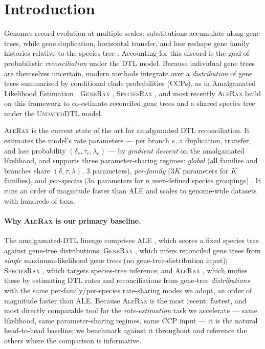 \documentclass[11pt]{article}
\newcommand{\bdelta}{\delta}
\newcommand{\btau}{\tau}
\newcommand{\blambda}{\lambda}
\begin{document}
\section{Introduction}
\label{sec:intro}

Genomes record evolution at multiple scales: substitutions accumulate along
gene trees, while gene duplication, horizontal transfer, and loss reshape gene
family histories relative to the species tree \citep{Szollosi2015}. Accounting
for this discord is the goal of probabilistic \emph{reconciliation} under the
DTL model. Because individual gene trees are themselves uncertain, modern
methods integrate over a \emph{distribution} of gene trees summarised by
conditional clade probabilities (CCPs), as in Amalgamated Likelihood
Estimation \citep{Szollosi2013,Hohna2012,Larget2013}. \textsc{GeneRax}
\citep{Morel2020}, \textsc{SpeciesRax} \citep{Morel2022}, and most recently
\textsc{AleRax} \citep{Morel2024} build on this framework to co-estimate
reconciled gene trees and a shared species tree under the \textsc{UndatedDTL}
model.

\textsc{AleRax} is the current state of the art for amalgamated DTL
reconciliation. It estimates the model's rate parameters --- per branch $e$, a
duplication, transfer, and loss probability
$(\bdelta_e,\btau_e,\blambda_e)$ --- by \emph{gradient descent} on the
amalgamated likelihood, and supports three parameter-sharing regimes:
\emph{global} (all families and branches share $(\bdelta,\btau,\blambda)$,
$3$ parameters), \emph{per-family} ($3K$ parameters for $K$ families), and
\emph{per-species} ($3n$ parameters for $n$ user-defined species groupings)
\citep{Morel2024}. It runs an order of magnitude faster than ALE and scales to
genome-wide datasets with hundreds of taxa.

\paragraph{Why \textsc{AleRax} is our primary baseline.} The amalgamated-DTL
lineage comprises ALE \citep{Szollosi2013}, which scores a fixed species tree
against gene-tree distributions; \textsc{GeneRax} \citep{Morel2020}, which
infers reconciled gene trees from \emph{single} maximum-likelihood gene trees
(no gene-tree-distribution input); \textsc{SpeciesRax} \citep{Morel2022}, which
targets species-tree inference; and \textsc{AleRax} \citep{Morel2024}, which
unifies these by estimating DTL rates and reconciliations from gene-tree
\emph{distributions} with the same per-family/per-species rate-sharing modes we
adopt, an order of magnitude faster than ALE. Because \textsc{AleRax} is the
most recent, fastest, and most directly comparable tool for the
\emph{rate-estimation} task we accelerate --- same likelihood, same
parameter-sharing regimes, same CCP input --- it is the natural head-to-head
baseline; we benchmark against it throughout and reference the others where the
comparison is informative.
\end{document}
